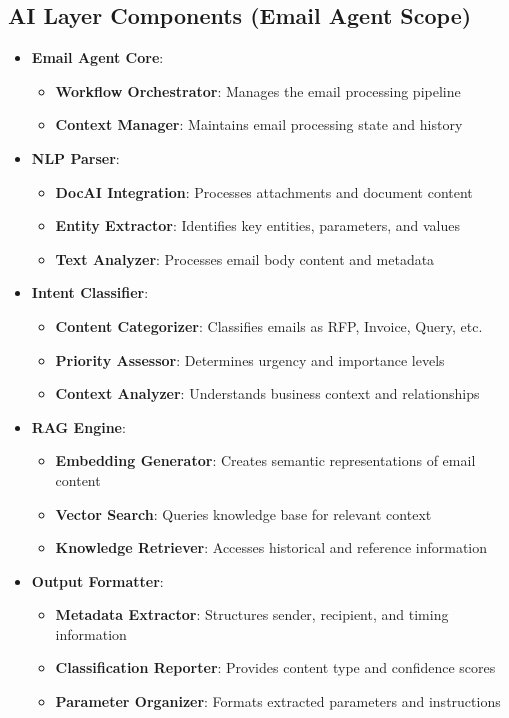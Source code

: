 \documentclass[12pt]{report}
\begin{document}
\subsection{AI Layer Components (Email Agent Scope)}
\begin{itemize}
  \item \textbf{Email Agent Core}:
    \begin{itemize}
      \item \textbf{Workflow Orchestrator}: Manages the email processing pipeline
      \item \textbf{Context Manager}: Maintains email processing state and history
    \end{itemize}
  \item \textbf{NLP Parser}:
    \begin{itemize}
      \item \textbf{DocAI Integration}: Processes attachments and document content
      \item \textbf{Entity Extractor}: Identifies key entities, parameters, and values
      \item \textbf{Text Analyzer}: Processes email body content and metadata
    \end{itemize}
  \item \textbf{Intent Classifier}:
    \begin{itemize}
      \item \textbf{Content Categorizer}: Classifies emails as RFP, Invoice, Query, etc.
      \item \textbf{Priority Assessor}: Determines urgency and importance levels
      \item \textbf{Context Analyzer}: Understands business context and relationships
    \end{itemize}
  \item \textbf{RAG Engine}:
    \begin{itemize}
      \item \textbf{Embedding Generator}: Creates semantic representations of email content
      \item \textbf{Vector Search}: Queries knowledge base for relevant context
      \item \textbf{Knowledge Retriever}: Accesses historical and reference information
    \end{itemize}
  \item \textbf{Output Formatter}:
    \begin{itemize}
      \item \textbf{Metadata Extractor}: Structures sender, recipient, and timing information
      \item \textbf{Classification Reporter}: Provides content type and confidence scores
      \item \textbf{Parameter Organizer}: Formats extracted parameters and instructions
    \end{itemize}
\end{itemize}
\end{document}
